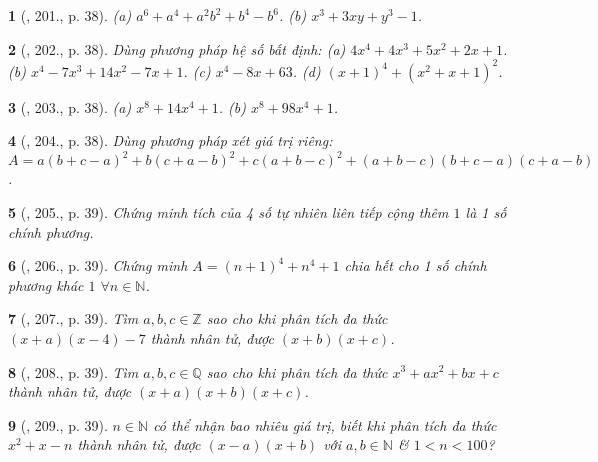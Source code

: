 \documentclass{article}
\newtheorem{baitoan}{}
\begin{document}
\begin{baitoan}[\cite{Binh_Toan_8_tap_1}, 201., p. 38]
	(a) $a^6 + a^4 + a^2b^2 + b^4 - b^6$. (b) $x^3 + 3xy + y^3  - 1$.
\end{baitoan}

\begin{baitoan}[\cite{Binh_Toan_8_tap_1}, 202., p. 38]
	Dùng phương pháp hệ số bất định: (a) $4x^4 + 4x^3 + 5x^2 + 2x + 1$. (b) $x^4 - 7x^3 + 14x^2 - 7x + 1$. (c) $x^4 - 8x + 63$. (d) $(x + 1)^4 + (x^2 + x + 1)^2$.
\end{baitoan}

\begin{baitoan}[\cite{Binh_Toan_8_tap_1}, 203., p. 38]
	(a) $x^8 + 14x^4 + 1$. (b) $x^8 + 98x^4 + 1$.
\end{baitoan}

\begin{baitoan}[\cite{Binh_Toan_8_tap_1}, 204., p. 38]
	Dùng phương pháp xét giá trị riêng: $A = a(b + c - a)^2 + b(c + a - b)^2 + c(a + b - c)^2 + (a + b - c)(b + c - a)(c + a - b)$.
\end{baitoan}

\begin{baitoan}[\cite{Binh_Toan_8_tap_1}, 205., p. 39]
	Chứng minh tích của 4 số tự nhiên liên tiếp cộng thêm $1$ là 1 số chính phương.
\end{baitoan}

\begin{baitoan}[\cite{Binh_Toan_8_tap_1}, 206., p. 39]
	Chứng minh $A = (n + 1)^4 + n^4 + 1$ chia hết cho 1 số chính phương khác $1$ $\forall  n\in\mathbb{N}$.
\end{baitoan}

\begin{baitoan}[\cite{Binh_Toan_8_tap_1}, 207., p. 39]
	Tìm $a,b,c\in\mathbb{Z}$ sao cho khi phân tích đa thức $(x + a)(x - 4) - 7$ thành nhân tử, được $(x + b)(x + c)$.
\end{baitoan}

\begin{baitoan}[\cite{Binh_Toan_8_tap_1}, 208., p. 39]
	Tìm $a,b,c\in\mathbb{Q}$ sao cho khi phân tích đa thức $x^3 + ax^2 + bx + c$ thành nhân tử, được $(x + a)(x + b)(x + c)$.
\end{baitoan}

\begin{baitoan}[\cite{Binh_Toan_8_tap_1}, 209., p. 39]
	$n\in\mathbb{N}$ có thể nhận bao nhiêu giá trị, biết khi phân tích đa thức $x^2 + x - n$ thành nhân tử, được $(x - a)(x + b)$ với $a,b\in\mathbb{N}$ \& $1 < n < 100$?
\end{baitoan}
\end{document}
